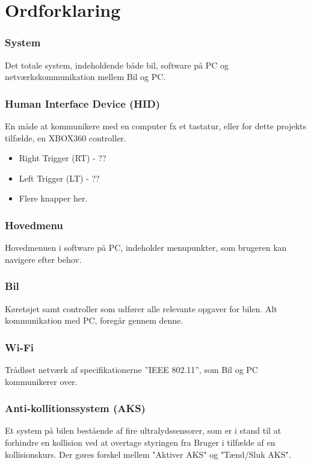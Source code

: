 
\section{Ordforklaring}

\subsubsection{System}
Det totale system, indeholdende både bil, software på PC og netværkskommunikation mellem Bil og PC. 

\subsubsection{Human Interface Device (HID)}
En måde at kommunikere med en computer fx et tastatur, eller for dette projekts tilfælde, en XBOX360 controller.

\begin{itemize}
	\item Right Trigger (RT) - ??
	\item Left Trigger (LT) - ??
	\item Flere knapper her.
\end{itemize}

\subsubsection{Hovedmenu}
Hovedmenuen i software på PC, indeholder menupunkter, som brugeren kan navigere efter behov.

\subsubsection{Bil}
Køretøjet samt controller som udfører alle relevante opgaver for bilen. Alt kommunikation med PC, foregår gennem denne.

\subsubsection{Wi-Fi}
Trådløst netværk af specifikationerne ''IEEE 802.11'', som Bil og PC kommunikerer over.

\subsubsection{Anti-kollitionssystem (AKS)}
Et system på bilen bestående af fire ultralydssensorer, som er i stand til at forhindre en kollision ved at overtage styringen fra Bruger i tilfælde af en kollisionskurs. Der gøres forskel mellem "Aktiver AKS" og "Tænd/Sluk AKS".

